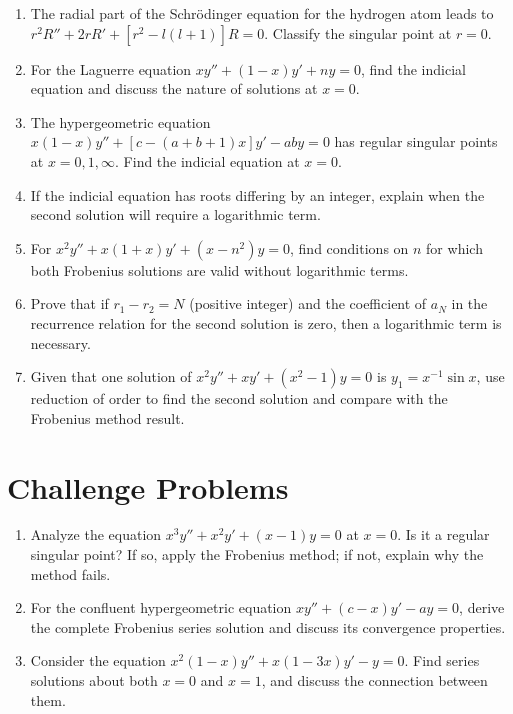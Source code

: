 \documentclass[12pt]{article}
\begin{document}
\begin{enumerate}[label=\textbf{\arabic*.}]
\item The radial part of the Schrödinger equation for the hydrogen atom leads to $r^2R'' + 2rR' + [r^2 - l(l+1)]R = 0$. Classify the singular point at $r = 0$.

\item For the Laguerre equation $xy'' + (1-x)y' + ny = 0$, find the indicial equation and discuss the nature of solutions at $x = 0$.

\item The hypergeometric equation $x(1-x)y'' + [c-(a+b+1)x]y' - aby = 0$ has regular singular points at $x = 0, 1, \infty$. Find the indicial equation at $x = 0$.

\item If the indicial equation has roots differing by an integer, explain when the second solution will require a logarithmic term.

\item For $x^2y'' + x(1+x)y' + (x-n^2)y = 0$, find conditions on $n$ for which both Frobenius solutions are valid without logarithmic terms.

\item Prove that if $r_1 - r_2 = N$ (positive integer) and the coefficient of $a_N$ in the recurrence relation for the second solution is zero, then a logarithmic term is necessary.

\item Given that one solution of $x^2y'' + xy' + (x^2-1)y = 0$ is $y_1 = x^{-1}\sin x$, use reduction of order to find the second solution and compare with the Frobenius method result.

\end{enumerate}

\section*{Challenge Problems}

\begin{enumerate}[label=\textbf{C\arabic*.}]
\item Analyze the equation $x^3y'' + x^2y' + (x-1)y = 0$ at $x = 0$. Is it a regular singular point? If so, apply the Frobenius method; if not, explain why the method fails.

\item For the confluent hypergeometric equation $xy'' + (c-x)y' - ay = 0$, derive the complete Frobenius series solution and discuss its convergence properties.

\item Consider the equation $x^2(1-x)y'' + x(1-3x)y' - y = 0$. Find series solutions about both $x = 0$ and $x = 1$, and discuss the connection between them.
\end{enumerate}
\end{document}

